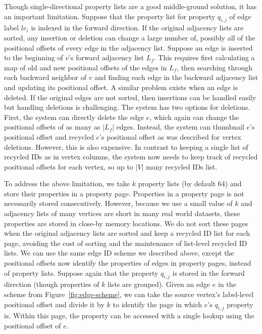  Though single-directional property lists are a good middle-ground solution, it has an important limitation. Suppose that the property list for property $q_{i,j}$ of edge label $le_i$ is indexed in the forward direction. If the original adjacency lists are sorted,  any insertion or deletion can change a large number of, possibly all of the positional offsets of every edge in the adjacency list. Suppose an edge is inserted to the beginning of $v$'s forward adjacency list $L_f$. This requires first calculating a map of old and new positional offsets of the edges in $L_f$, then searching through each backward neighbor of $v$ and finding each edge in the backward adjacency list and updating its positional offset. A similar problem exists when an edge is deleted. If the original edges are not sorted, then insertions can be handled easily but handling deletions is challenging. The system has two options for deletions. First, the system can directly delete the edge $e$, which again can change the positional offsets of as many as $|L_f|$ edges. Instead, the system can thumbnail $e$'s positional offset and recycled $e$'s positional offset as was described for vertex deletions. However, this is also expensive. In contrast to keeping a single list of recycled IDs as in vertex columns, the system now needs to keep track of recycled positional offsets for each vertex, so up to $|V|$ many recycled IDs list.

 To address the above limitation, we take $k$ property lists (by default 64) and store their properties in a property page. Properties in a property page is not necessarily stored consecutively. However, because we use a small value of $k$ and adjacency lists of many vertices are short in many real world datasets, these properties are stored in close-by memory locations. We do not sort these pages when the original adjacency lists are sorted and keep a recycled ID list for each page, avoiding the cost of sorting and the maintenance of list-level recycled ID lists. We can use the same edge ID scheme we described above, except the positional offsets now identify the properties of edges in property pages, instead of property lists. Suppose again that the property $q_{i, j}$ is stored in the forward direction (though properties of $k$ lists are grouped). Given an edge $e$ in the scheme from Figure~\ref{fig:edge-scheme}, we can take the source vertex's label-level positional offset and divide it by $k$ to identify the page in which $e$'s $q_{i, j}$ property is. Within this page, the property can be accessed with a single lookup using the positional offset of $e$.

